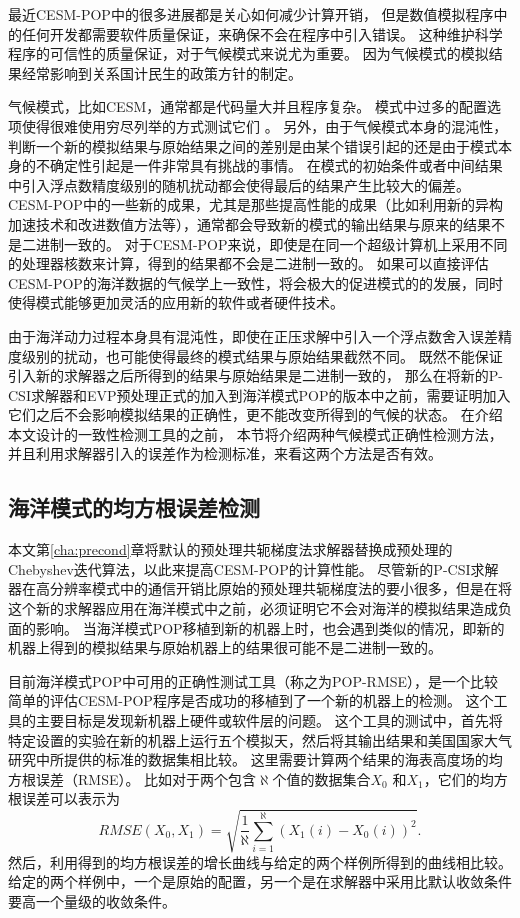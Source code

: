 最近CESM-POP中的很多进展都是关心如何减少计算开销\cite{yong2015}， 但是数值模拟程序中的任何开发都需要软件质量保证，来确保不会在程序中引入错误。 
这种维护科学程序的可信性的质量保证，对于气候模式来说尤为重要。 
因为气候模式的模拟结果经常影响到关系国计民生的政策方针的制定\cite{carson2002, easterbrook2011}。 

  
气候模式，比如CESM，通常都是代码量大并且程序复杂。 
模式中过多的配置选项使得很难使用穷尽列举的方式测试它们 \cite{clune2011, pipitone2012}。 
另外，由于气候模式本身的混沌性，判断一个新的模拟结果与原始结果之间的差别是由某个错误引起的还是由于模式本身的不确定性引起是一件非常具有挑战的事情。 
在模式的初始条件或者中间结果中引入浮点数精度级别的随机扰动都会使得最后的结果产生比较大的偏差。
CESM-POP中的一些新的成果，尤其是那些提高性能的成果（比如利用新的异构加速技术和改进数值方法等），通常都会导致新的模式的输出结果与原来的结果不是二进制一致的。 
对于CESM-POP来说，即使是在同一个超级计算机上采用不同的处理器核数来计算，得到的结果都不会是二进制一致的。 
如果可以直接评估CESM-POP的海洋数据的气候学上一致性，将会极大的促进模式的的发展，同时使得模式能够更加灵活的应用新的软件或者硬件技术。 

由于海洋动力过程本身具有混沌性，即使在正压求解中引入一个浮点数舍入误差精度级别的扰动，也可能使得最终的模式结果与原始结果截然不同。 
既然不能保证引入新的求解器之后所得到的结果与原始结果是二进制一致的，
那么在将新的P-CSI求解器和EVP预处理正式的加入到海洋模式POP的版本中之前，需要证明加入它们之后不会影响模拟结果的正确性，更不能改变所得到的气候的状态。
在介绍本文设计的一致性检测工具的之前，
本节将介绍两种气候模式正确性检测方法，并且利用求解器引入的误差作为检测标准，来看这两个方法是否有效。


\subsection{海洋模式的均方根误差检测}
\label{verify:premethod}
 
本文第\ref{cha:precond}章将默认的预处理共轭梯度法求解器替换成预处理的Chebyshev迭代算法，以此来提高CESM-POP的计算性能。
尽管新的P-CSI求解器在高分辨率模式中的通信开销比原始的预处理共轭梯度法的要小很多，但是在将这个新的求解器应用在海洋模式中之前，必须证明它不会对海洋的模拟结果造成负面的影响。 
当海洋模式POP移植到新的机器上时，也会遇到类似的情况，即新的机器上得到的模拟结果与原始机器上的结果很可能不是二进制一致的。 

目前海洋模式POP中可用的正确性测试工具（称之为POP-RMSE），是一个比较简单的评估CESM-POP程序是否成功的移植到了一个新的机器上的检测。 
这个工具的主要目标是发现新机器上硬件或软件层的问题。 
这个工具的测试中，首先将特定设置的实验在新的机器上运行五个模拟天，然后将其输出结果和美国国家大气研究中所提供的标准的数据集相比较。
这里需要计算两个结果的海表高度场的均方根误差（RMSE）。 
比如对于两个包含$\aleph$个值的数据集合$X_0$ 和$X_1$，它们的均方根误差可以表示为
 \begin{equation*}
 RMSE(X_0, X_1) = \sqrt{\frac{1}{\aleph}\sum_{i=1}^\aleph(X_1(i)-X_0(i))^2}.
 \end{equation*}
然后，利用得到的均方根误差的增长曲线与给定的两个样例所得到的曲线相比较。 
给定的两个样例中，一个是原始的配置，另一个是在求解器中采用比默认收敛条件要高一个量级的收敛条件。 


